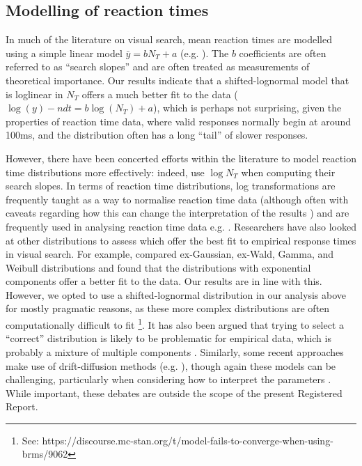 \documentclass[preprint,12pt,authoryear]{elsarticle}
\begin{document}
\subsection{Modelling of reaction times}

In much of the literature on visual search, mean reaction times are modelled using a simple linear model $\bar{y} = b N_T + a$ (e.g. \cite{treisman1988feature,rosenholtz2012summary, hughes2016quantifying}). The $b$ coefficients are often referred to as ``search slopes'' and are often treated as measurements of theoretical importance. Our results indicate that a shifted-lognormal model that is loglinear in $N_T$ offers a much better fit to the data ($\log(y) - ndt = b\log(N_T) + a$), which is perhaps not surprising, given the properties of reaction time data, where valid responses normally begin at around 100ms, and the distribution often has a long ``tail'' of slower responses.

However, there have been concerted efforts within the literature to model reaction time distributions more effectively: indeed, \cite{buetti2019predicting} use $\log{N_T}$ when computing their search slopes. In terms of reaction time distributions, log transformations are frequently taught as a way to normalise reaction time data (although often with caveats regarding how this can change the interpretation of the results \citep{osborne2002notes}) and are frequently used in analysing reaction time data e.g. \citep{clarke2022visual}. Researchers have also looked at other distributions to assess which offer the best fit to empirical response times in visual search. For example, \cite{palmer2011shapes} compared ex-Gaussian, ex-Wald, Gamma, and Weibull distributions and found that the distributions with exponential components offer a better fit to the data. Our results are in line with this. However, we opted to use a shifted-lognormal distribution in our analysis above for mostly pragmatic reasons, as these more complex distributions are often computationally difficult to fit \footnote {See: https://discourse.mc-stan.org/t/model-fails-to-converge-when-using-brms/9062}. It has also been argued that trying to select a ``correct'' distribution is likely to be problematic for empirical data, which is probably a mixture of multiple components \citep{wolfe2010reaction}. Similarly, some recent approaches make use of drift-diffusion methods (e.g. \cite{wolfe2010varying, yu2022attentional, corbett2020diffusion}), though again these models can be challenging, particularly when considering how to interpret the parameters \citep{evans2019evidence, bompas2023non}. While important, these debates are outside the scope of the present Registered Report. 
\end{document}
